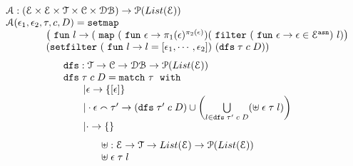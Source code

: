 \begin{defn}
\[
\begin{array}{l}
	\mathcal{A}:(\eventset \times \eventset \times \mathcal{T} \times \cdom \times \dbdom )\to \mathcal{P}(List(\eventset))
	\\
	\mathcal{A}(\event_1, \event_2, \trace, c, D) 
	= 
	\kw{setmap} ~
	\\ \qquad \qquad
	\left(\efun l \to ( \emap 
		(\efun  \event \to \pi_1(\event)^{\pi_2(\event)})
	(\efilter 
		(\efun \event \to  \event \in \eventset^{\asn}) ~ l) \right)
	\\ \qquad \qquad
	(\kw{setfilter} ~
		(\efun l \to l = [\event_1, \cdots, \event_2]) ~ (\kw{dfs} \eapp \trace \eapp c \eapp  D ))
	\end{array}
\]
%
%
\[
\begin{array}{l}
	\kw{dfs} : \mathcal{T} \to \cdom \to \dbdom \to \mathcal{P}(List(\eventset))
	\\
	\kw{dfs} \eapp \trace \eapp c \eapp  D
	= 
	\ematch~  \trace ~ \ewith
	\\ \qquad
	| \event \to \{[\event]\}
	\\ \qquad
	|  \cdot \event \tracecat \trace' \to  
	(\kw{dfs} \eapp \trace'  \eapp c  \eapp D)
	\cup 
	\left(   \bigcup\limits_{l \in \kw{dfs} \eapp \trace' \eapp c \eapp  D }
	\left( \uplus \eapp  \event  \eapp \trace  \eapp l \right)
	\right)
	\\ \qquad
	| \cdot \to \{\}
\end{array}
\]
%
%
\[
\begin{array}{l}
	\uplus : \mathcal{E} \to \mathcal{T} \to List(\mathcal{E}) \to \mathcal{P}(List(\mathcal{E}))
	\\
	\uplus \;  \mathtt{\epsilon}  \; \mathtt{\tau}  \; l

\end{array}\]
\end{defn}
